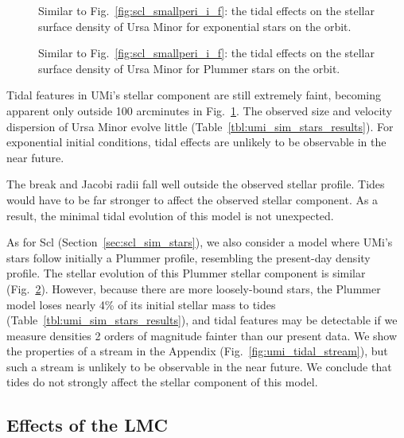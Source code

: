 \begin{figure}
\centering
{}
\caption[Ursa Minor simulated density profiles]{Similar to
Fig.~\ref{fig:scl_smallperi_i_f}: the tidal effects on the stellar
surface density of Ursa Minor for exponential stars on the \smallperi{}
orbit.}\label{fig:umi_smallperi_i_f}
\end{figure}

\begin{figure}
\centering
{}
\caption[Ursa Minor Plummer model density]{Similar to
Fig.~\ref{fig:scl_smallperi_i_f}: the tidal effects on the stellar
surface density of Ursa Minor for Plummer stars on the \smallperi{}
orbit.}\label{fig:umi_plummer_i_f}
\end{figure}

Tidal features in UMi's stellar component are still extremely faint,
becoming apparent only outside 100 arcminutes in
Fig.~\ref{fig:umi_smallperi_i_f}. The observed size and velocity
dispersion of Ursa Minor evolve little
(Table~\ref{tbl:umi_sim_stars_results}). For exponential initial
conditions, tidal effects are unlikely to be observable in the near
future.

The break and Jacobi radii fall well outside the observed stellar
profile. Tides would have to be far stronger to affect the observed
stellar component. As a result, the minimal tidal evolution of this
model is not unexpected.

As for Scl (Section~\ref{sec:scl_sim_stars}), we also consider a model
where UMi's stars follow initially a Plummer profile, resembling the
present-day density profile. The stellar evolution of this Plummer
stellar component is similar (Fig.~\ref{fig:umi_plummer_i_f}). However,
because there are more loosely-bound stars, the Plummer model loses
nearly 4\% of its initial stellar mass to tides
(Table~\ref{tbl:umi_sim_stars_results}), and tidal features may be
detectable if we measure densities 2 orders of magnitude fainter than
our present data. We show the properties of a stream in the Appendix
(Fig.~\ref{fig:umi_tidal_stream}), but such a stream is unlikely to be
observable in the near future. We conclude that tides do not strongly
affect the stellar component of this model.

\subsection{Effects of the LMC}\label{effects-of-the-lmc}

